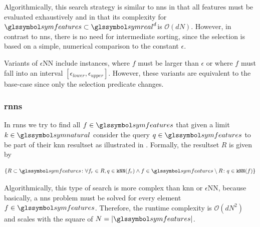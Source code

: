 Algorithmically, this search strategy is similar to \acrshort{nns} in that all features must be evaluated exhaustively and in that its complexity for $\symfeatures \subset \symreal^d$is $\mathcal{O}(dN)$. However, in contrast to \acrshort{nns}, there is no need for intermediate sorting, since the selection is based on a simple, numerical comparison to the constant $\epsilon$.

Variants of $\epsilon$NN include instances, where $f$ must be larger than $\epsilon$ or where $f$ must fall into an interval $[ \epsilon_{lower}, \epsilon_{upper} ]$. However, these variants are equivalent to the base-case since only the selection predicate changes.

\subsubsection{\acrfull{rnns}}

In \acrshort{rnns} we try to find all $f \in \symfeatures$ that given a limit $k \in \symnatural$ consider the query $q \in \symfeatures$ to be part of their \acrshort{knn} resultset as illustrated in . Formally, the resultset $R$ is given by  

\begin{equation}
    \label{eq:rknn}
    \lbrace R \subset \symfeatures \colon \forall f_r \in R, q \in \texttt{kNN}(f_r) \wedge f \in \symfeatures \setminus R \colon q \in \texttt{kNN}(f)  \rbrace
\end{equation}

Algorithmically, this type of search is more complex than \acrshort{knn} or $\epsilon$NN, because basically, a \acrshort{nns} problem must be solved for every element $f \in \symfeatures$. Therefore, the runtime complexity is $\mathcal{O}(dN^2)$ and scales with the square of $N = |\symfeatures|$. 

